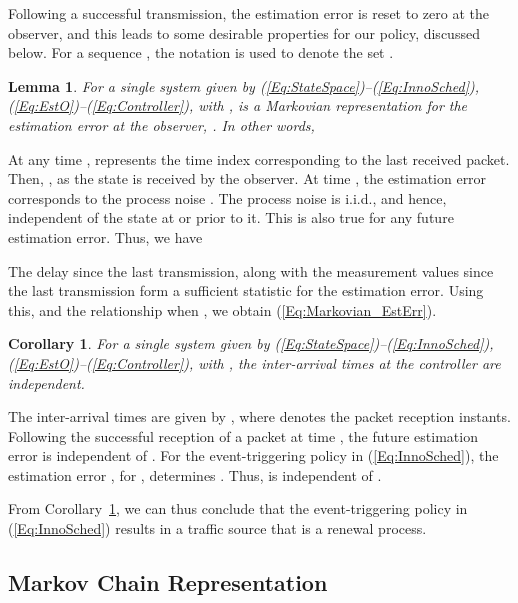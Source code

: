 \documentclass[journal]{IEEEtran}
\newtheorem{corollary}[theorem]{Corollary}
\newtheorem{lemma}[theorem]{Lemma}
\begin{document}
Following a successful transmission, the estimation error is reset to zero at the observer, and this leads to some desirable properties for our policy, discussed below. For a sequence , the notation  is used to denote the set .
\begin{lemma} \label{Lemma:Markovian_EstErr}
For a single system given by (\ref{Eq:StateSpace})--(\ref{Eq:InnoSched}), (\ref{Eq:EstO})--(\ref{Eq:Controller}), with ,  is a Markovian representation for the estimation error at the observer, . In other words,

\end{lemma}
\begin{IEEEproof}
At any time ,  represents the time index corresponding to the last received packet. Then, , as the state  is received by the observer. At time , the estimation error corresponds to the process noise . The process noise is i.i.d., and hence, independent of the state at  or prior to it. This is also true for any future estimation error. Thus, we have

The delay since the last transmission, along with the measurement values since the last transmission form a sufficient statistic for the estimation error. Using this, and the relationship  when , we obtain (\ref{Eq:Markovian_EstErr}).
\end{IEEEproof}

\begin{corollary} \label{Corollary:ETrenewal}
For a single system given by (\ref{Eq:StateSpace})--(\ref{Eq:InnoSched}), (\ref{Eq:EstO})--(\ref{Eq:Controller}), with , the inter-arrival times at the controller are independent.
\end{corollary}
\begin{IEEEproof}
The inter-arrival times are given by , where  denotes the packet reception instants. Following the successful reception of a packet at time , the future estimation error is independent of . For the event-triggering policy in (\ref{Eq:InnoSched}), the estimation error , for , determines . Thus,  is independent of .
\end{IEEEproof}
From Corollary~\ref{Corollary:ETrenewal}, we can thus conclude that the event-triggering policy in (\ref{Eq:InnoSched}) results in a traffic source that is a renewal process.

\subsection{Markov Chain Representation} \label{S:MCnotraffic}
\end{document}
